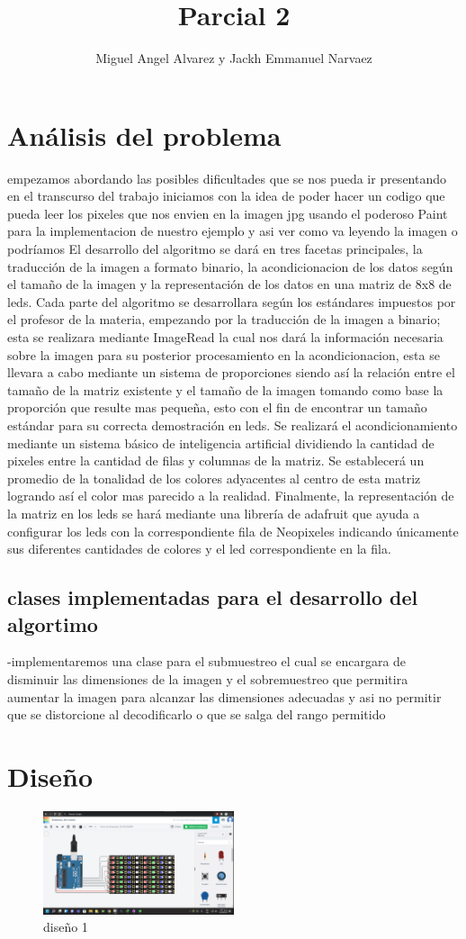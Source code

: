 \documentclass{article}
\title{Parcial 2}
\author{Miguel Angel Alvarez y Jackh Emmanuel Narvaez}
\begin{document}
\maketitle



\section{Análisis del problema}

empezamos abordando las posibles dificultades que se nos pueda ir presentando en el transcurso del trabajo iniciamos con la idea de poder hacer un codigo que pueda leer los pixeles que nos envien en la imagen jpg usando el poderoso Paint para la implementacion de nuestro ejemplo y asi ver como va leyendo la imagen o podríamos El desarrollo del algoritmo se dará en tres facetas principales, la traducción de la imagen a formato binario, la acondicionacion de los datos según el tamaño de la imagen y la representación de los datos en una matriz de 8x8 de leds. Cada parte del algoritmo se desarrollara según los estándares impuestos por el profesor de la materia, empezando por la traducción de la imagen a binario; esta se realizara mediante ImageRead la cual nos dará la información necesaria sobre la imagen para su posterior procesamiento en la acondicionacion, esta se llevara a cabo mediante un sistema de proporciones siendo así la relación entre el tamaño de la matriz existente y el tamaño de la imagen tomando como base la proporción que resulte mas pequeña, esto con el fin de encontrar un tamaño estándar para su correcta demostración en leds. Se realizará el acondicionamiento mediante un sistema básico de inteligencia artificial dividiendo la cantidad de pixeles entre la cantidad de filas y columnas de la matriz. Se establecerá un promedio de la tonalidad de los colores adyacentes al centro de esta matriz logrando así el color mas parecido a la realidad. Finalmente, la representación de la matriz en los leds se hará mediante una librería de adafruit que ayuda a configurar los leds con la correspondiente fila de Neopixeles indicando únicamente sus diferentes cantidades de colores y el led correspondiente en la fila. 
\subsection{clases implementadas para el desarrollo del algortimo}
-implementaremos una clase para el submuestreo el cual se encargara de disminuir las dimensiones de la imagen y el sobremuestreo que permitira aumentar la imagen para alcanzar las dimensiones adecuadas y asi no permitir que se distorcione al decodificarlo o que se salga del rango permitido 




\section{Diseño}



\begin{figure}
\centering
\includegraphics[width=0.5\textwidth]{image1.png}
\caption{diseño 1}
\end{figure}
\end{document}
